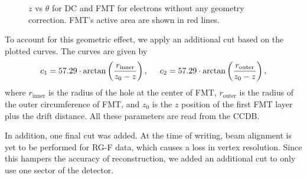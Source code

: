     \begin{figure}[t!]
        \centering{}
        \caption[$z$ vs $\theta$ for DC and FMT.]{$z$ vs $\theta$ for DC and FMT for electrons without any geometry correction. FMT's active area are shown in red lines.}
        \label{fig::vz_vs_theta}
    \end{figure}

    To account for this geometric effect, we apply an additional cut based on the plotted curves.
    The curves are given by
    \begin{equation*}
        c_1 = 57.29 \cdot \arctan\left(\frac{r_\text{inner}}{z_0 - z}\right), \hspace{0.5cm}
        c_2 = 57.29 \cdot \arctan\left(\frac{r_\text{outer}}{z_0 - z}\right),
    \end{equation*}
    where $r_\text{inner}$ is the radius of the hole at the center of FMT, $r_\text{outer}$ is the radius of the outer circumference of FMT, and $z_0$ is the $z$ position of the first FMT layer plus the drift distance.
    All these parameters are read from the CCDB.

    In addition, one final cut was added.
    At the time of writing, beam alignment is yet to be performed for RG-F data, which causes a loss in vertex resolution.
    Since this hampers the accuracy of reconstruction, we added an additional cut to only use one sector of the detector.

